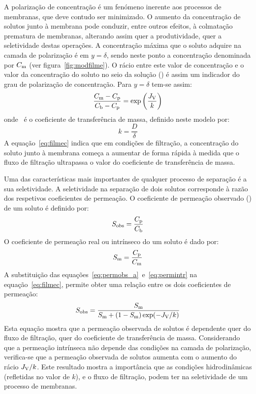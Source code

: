 A polarização de concentração é um fenómeno inerente aos processos de membranas, que deve contudo ser minimizado. O aumento da concentração de solutos junto à membrana pode conduzir, entre outros efeitos, à colmatação prematura de membranas, alterando assim quer a produtividade, quer a seletividade destas operações.
A concentração máxima que o soluto adquire na camada de polarização é em $y=\delta$, sendo neste ponto a concentração denominada por $C_{\mathrm{m}}$ (ver figura~\ref{fig:modfilme}). %
O rácio entre este valor de concentração e o valor da concentração do soluto no seio da solução (\concb) é assim um indicador do grau de polarização de concentração. Para $y=\delta$ tem-se assim:
\begin{equation}
	\label{eq:filmec}
	\frac{C_{\mathrm{m}}-C_{\mathrm{p}}}{C_{\mathrm{b}}-C_{\mathrm{p}}}=\exp\left( \frac{J_{\mathrm{V}}}{k}\right)
\end{equation}
onde \coeficientemassa\ é o coeficiente de transferência de massa, definido neste modelo por:
\begin{equation}
\label{eq:kmassa}
k=\frac{D}{\delta}
\end{equation}
A equação~\ref{eq:filmec} indica que em condições de filtração, a concentração do soluto junto à membrana começa a aumentar de forma rápida à medida que o fluxo de filtração ultrapassa o valor do coeficiente de transferência de massa. 

Uma das características mais importantes de qualquer processo de separação é a sua seletividade. A seletividade na separação de dois solutos corresponde à razão dos respetivos coeficientes de permeação. O coeficiente de permeação observado (\permobs) de um soluto é definido por:
\begin{equation}
	\label{eq:permobs_a}
	S_{\mathrm{obs}}=\frac{C_{\mathrm{p}}}{C_{\mathrm{b}}}
\end{equation}
O coeficiente de permeação real ou intrínseco do um soluto é dado por:
\begin{equation}
	\label{eq:permintr}
	S_{\mathrm{m}}=\frac{C_{\mathrm{p}}}{C_{\mathrm{m}}}
\end{equation}
A substituição das equações~\ref{eq:permobs_a}~e~\ref{eq:permintr} na equação~\ref{eq:filmec}, permite obter uma relação entre os dois coeficientes de permeação:
\begin{equation}
\label{eq:sobsvssm}
S_{\mathrm{obs}}=\frac{S_{\mathrm{m}}}{S_{\mathrm{m}}+(1-S_{\mathrm{m}})\exp(-J_{\mathrm{V}}/k)}
\end{equation}
Esta equação mostra que a permeação observada de solutos é dependente quer do fluxo de filtração, quer do coeficiente de transferência de massa. Considerando que a permeação intrínseca não depende das condições na camada de polarização, verifica-se que a permeação observada de solutos aumenta com o aumento do rácio $J_{\mathrm{V}}/k$. Este resultado mostra a importância que as condições hidrodinâmicas (refletidas no valor de $k$), e o fluxo de filtração, podem ter na seletividade de um processo de membranas.

